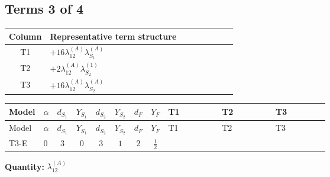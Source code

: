\documentclass[8pt]{article}
\begin{document}
\begin{landscape}
\subsection*{Terms 3 of 4}
\begin{center}
\begin{tabular}{@{}c >{\raggedright\arraybackslash}p{0.82\linewidth}@{}}
\toprule
Column & Representative term structure \\
\midrule
T1 & \(\displaystyle +16 {\lambda_{12}^{(A)}} {\lambda_{S_1}^{(A)}}\) \\
\midrule
T2 & \(\displaystyle +2 {\lambda_{12}^{(A)}} {\lambda_{S_2}^{(1)}}\) \\
\midrule
T3 & \(\displaystyle +16 {\lambda_{12}^{(A)}} {\lambda_{S_2}^{(A)}}\) \\
\midrule
\bottomrule
\end{tabular}
\end{center}
\smallskip
\tiny
\begin{longtable}{@{}llcccccc >{\raggedright\arraybackslash}p{0.21\linewidth} >{\raggedright\arraybackslash}p{0.21\linewidth} >{\raggedright\arraybackslash}p{0.21\linewidth}@{}}
\toprule
Model & $\alpha$ & $d_{S_1}$ & $Y_{S_1}$ & $d_{S_2}$ & $Y_{S_2}$ & $d_F$ & $Y_F$ & T1 & T2 & T3 \\
\midrule
\endfirsthead
\toprule
Model & $\alpha$ & $d_{S_1}$ & $Y_{S_1}$ & $d_{S_2}$ & $Y_{S_2}$ & $d_F$ & $Y_F$ & T1 & T2 & T3 \\
\midrule
\endhead
T3-E & $0$ & $3$ & $0$ & $3$ & $1$ & $2$ & $\frac{1}{2}$ & \scriptsize\adjustbox{max width=\linewidth}{$\begin{gathered} +16 {\lambda_{12}^{(A)}} {\lambda_{S_1}^{(A)}}\end{gathered}$} & \scriptsize\adjustbox{max width=\linewidth}{$\begin{gathered} +2 {\lambda_{12}^{(A)}} {\lambda_{S_2}^{(1)}}\end{gathered}$} & \scriptsize\adjustbox{max width=\linewidth}{$\begin{gathered} +16 {\lambda_{12}^{(A)}} {\lambda_{S_2}^{(A)}}\end{gathered}$} \\
\midrule
\bottomrule
\end{longtable}
\clearpage
\noindent\textbf{Quantity: }$\lambda_{12}^{(A)}$\par\smallskip

\end{landscape}
\end{document}
